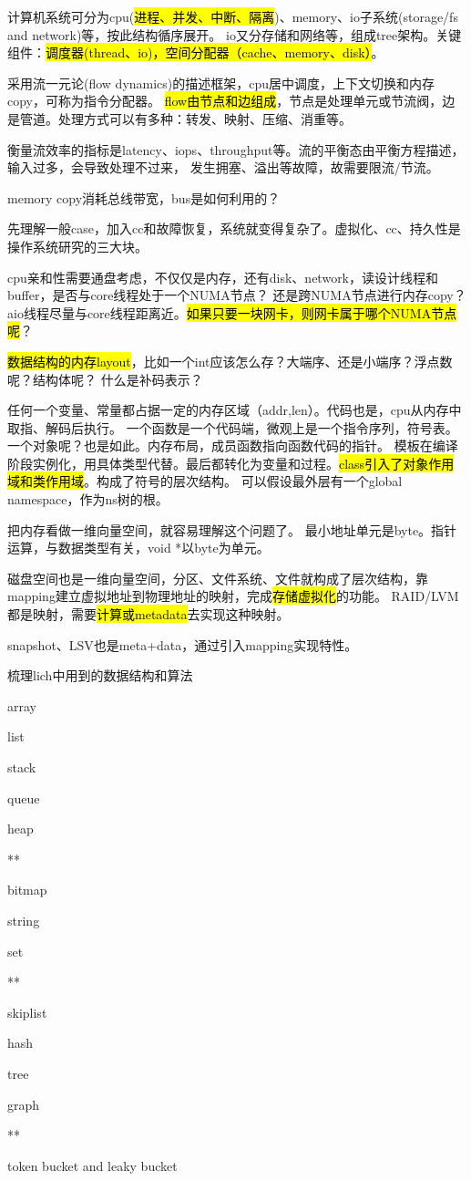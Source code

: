 计算机系统可分为cpu(\hl{进程、并发、中断、隔离})、memory、io子系统(storage/fs and network)等，按此结构循序展开。
io又分存储和网络等，组成tree架构。关键组件：\hl{调度器(thread、io)，空间分配器（cache、memory、disk）}。

采用流一元论(flow dynamics)的描述框架，cpu居中调度，上下文切换和内存copy，可称为指令分配器。
\hl{flow由节点和边组成}，节点是处理单元或节流阀，边是管道。处理方式可以有多种：转发、映射、压缩、消重等。

衡量流效率的指标是latency、iops、throughput等。流的平衡态由平衡方程描述，输入过多，会导致处理不过来，
发生拥塞、溢出等故障，故需要限流/节流。

memory copy消耗总线带宽，bus是如何利用的？

先理解一般case，加入cc和故障恢复，系统就变得复杂了。虚拟化、cc、持久性是操作系统研究的三大块。

cpu亲和性需要通盘考虑，不仅仅是内存，还有disk、network，读设计线程和buffer，是否与core线程处于一个NUMA节点？
还是跨NUMA节点进行内存copy？ aio线程尽量与core线程距离近。\hl{如果只要一块网卡，则网卡属于哪个NUMA节点呢}？

\hrulefill

\hl{数据结构的内存layout}，比如一个int应该怎么存？大端序、还是小端序？浮点数呢？结构体呢？
什么是补码表示？

任何一个变量、常量都占据一定的内存区域（addr,len）。代码也是，cpu从内存中取指、解码后执行。
一个函数是一个代码端，微观上是一个指令序列，符号表。一个对象呢？也是如此。内存布局，成员函数指向函数代码的指针。
模板在编译阶段实例化，用具体类型代替。最后都转化为变量和过程。\hl{class引入了对象作用域和类作用域}。构成了符号的层次结构。
可以假设最外层有一个global namespace，作为ns树的根。

把内存看做一维向量空间，就容易理解这个问题了。
最小地址单元是byte。指针运算，与数据类型有关，void *以byte为单元。

磁盘空间也是一维向量空间，分区、文件系统、文件就构成了层次结构，靠mapping建立虚拟地址到物理地址的映射，完成\hl{存储虚拟化}的功能。
RAID/LVM都是映射，需要\hl{计算或metadata}去实现这种映射。

snapshot、LSV也是meta+data，通过引入mapping实现特性。

\hrulefill

梳理lich中用到的数据结构和算法
\begin{enumbox}
\item array
\item list
\item stack
\item queue
\item heap
\item ***
\item bitmap
\item string
\item set
\item ***
\item skiplist
\item hash
\item tree
\item graph
\item ***
\item token bucket and leaky bucket
\end{enumbox}

